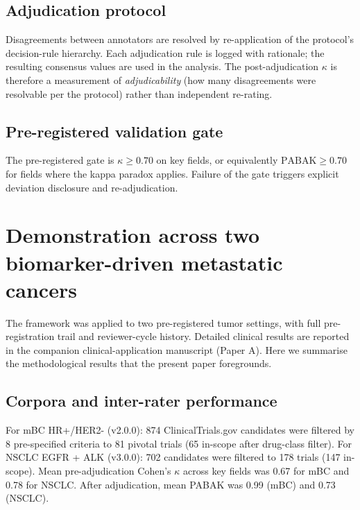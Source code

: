 \documentclass[11pt,a4paper]{article}
\begin{document}
\subsection{Adjudication protocol}
Disagreements between annotators are resolved by re-application of the protocol's decision-rule hierarchy. Each adjudication rule is logged with rationale; the resulting consensus values are used in the analysis. The post-adjudication $\kappa$ is therefore a measurement of \emph{adjudicability} (how many disagreements were resolvable per the protocol) rather than independent re-rating.

\subsection{Pre-registered validation gate}
The pre-registered gate is $\kappa \ge 0.70$ on key fields, or equivalently $\mathrm{PABAK} \ge 0.70$ for fields where the kappa paradox applies. Failure of the gate triggers explicit deviation disclosure and re-adjudication.

\section{Demonstration across two biomarker-driven metastatic cancers}\label{sec:demo}

The framework was applied to two pre-registered tumor settings, with full pre-registration trail and reviewer-cycle history. Detailed clinical results are reported in the companion clinical-application manuscript (Paper A). Here we summarise the methodological results that the present paper foregrounds.

\subsection{Corpora and inter-rater performance}
For mBC HR+/HER2- (v2.0.0): 874 ClinicalTrials.gov candidates were filtered by 8 pre-specified criteria to 81 pivotal trials (65 in-scope after drug-class filter). For NSCLC EGFR + ALK (v3.0.0): 702 candidates were filtered to 178 trials (147 in-scope). Mean pre-adjudication Cohen's $\kappa$ across key fields was 0.67 for mBC and 0.78 for NSCLC. After adjudication, mean PABAK was 0.99 (mBC) and 0.73 (NSCLC).
\end{document}

